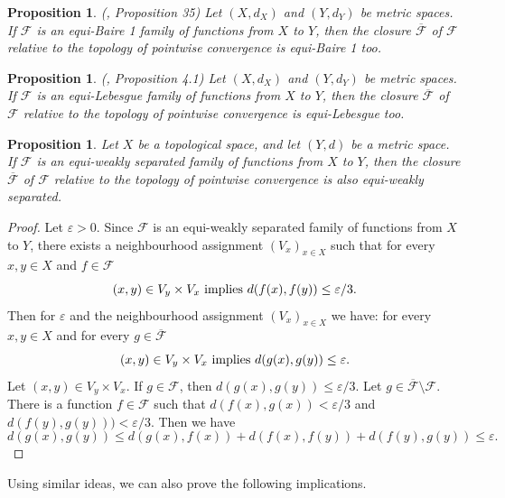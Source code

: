 \documentclass[a4paper]{amsart}
\theoremstyle{plain}
\newtheorem{proposition}[theorem]{Proposition}
\theoremstyle{definition}
\theoremstyle{remark}
\numberwithin{equation}{section}
\begin{document}
\begin{proposition} (\cite{Le}, Proposition 35) Let $(X,d_X)$  and $(Y,d_Y)$ be  metric spaces.  If $\mathcal F$ is an equi-Baire 1 family of functions from $X$ to $Y$, then the closure $\overline{\mathcal F}$ of $\mathcal F$
relative to the topology of pointwise convergence is equi-Baire 1 too.
\end{proposition}

\begin{proposition} (\cite{BHH}, Proposition 4.1) Let $(X,d_X)$  and $(Y,d_Y)$ be  metric spaces.  If $\mathcal F$ is an equi-Lebesgue family of functions from $X$ to $Y$, then the closure $\overline{\mathcal F}$ of $\mathcal F$
relative to the topology of pointwise convergence is equi-Lebesgue too.
\end{proposition}

\begin{proposition}
Let $X$ be a topological space, and let $(Y,d)$ be a metric space.  If $\mathcal F$ is an equi-weakly separated family of functions from $X$ to $Y$, then the closure $\overline{\mathcal F}$ of $\mathcal F$
relative to the topology of pointwise convergence is also equi-weakly separated.
\end{proposition}
\begin{proof} Let $\varepsilon > 0$. Since $\mathcal F$ is an equi-weakly separated family of functions from $X$ to $Y$, there exists a neighbourhood assignment $(V_x)_{x \in X}$ such that for every $x, y \in X$ and $f \in \mathcal F$
$$(x,y) \in V_y \times V_x \textup{\ implies\ } d(f(x),f(y)) \le \varepsilon/3.$$
Then for $\varepsilon$ and   the neighbourhood assignment $(V_x)_{x \in X}$ we have: for every $x, y \in X$ and for every $g \in \overline{\mathcal F}$
$$(x,y) \in V_y \times V_x \textup{\ implies\ } d(g(x),g(y)) \le \varepsilon.$$
Let $(x,y) \in V_y \times V_x$. If $g \in \mathcal F$,  then $d(g(x),g(y)) \le \varepsilon/3$. Let  $g \in \overline{\mathcal F} \setminus \mathcal F$. There is a function $f \in \mathcal F$ such that $d(f(x),g(x)) < \varepsilon/3$ and $d(f(y),g(y))) < \varepsilon/3$. 
Then we have
$$d(g(x),g(y)) \le d(g(x),f(x)) + d(f(x),f(y)) + d(f(y),g(y)) \le \varepsilon.$$
\end{proof}

Using similar ideas, we can also prove the following implications.
\end{document}
